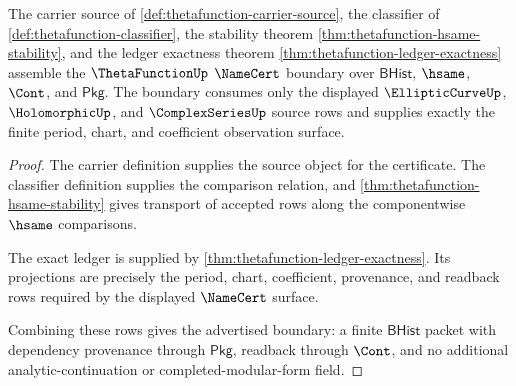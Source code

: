 \begin{theorem}
\label{thm:thetafunction-namecert-boundary}
The carrier source of \autoref{def:thetafunction-carrier-source}, the
classifier of \autoref{def:thetafunction-classifier}, the stability theorem
\autoref{thm:thetafunction-hsame-stability}, and the ledger exactness theorem
\autoref{thm:thetafunction-ledger-exactness} assemble the $\ThetaFunctionUp$
$\NameCert$ boundary over $\mathsf{BHist}$, $\hsame$, $\Cont$, and
$\mathsf{Pkg}$. The boundary consumes only the displayed $\EllipticCurveUp$,
$\HolomorphicUp$, and $\ComplexSeriesUp$ source rows and supplies exactly the
finite period, chart, and coefficient observation surface.
\end{theorem}
\begin{proof}
The carrier definition supplies the source object for the certificate. The
classifier definition supplies the comparison relation, and
\autoref{thm:thetafunction-hsame-stability} gives transport of accepted rows
along the componentwise $\hsame$ comparisons.

The exact ledger is supplied by
\autoref{thm:thetafunction-ledger-exactness}. Its projections are precisely the
period, chart, coefficient, provenance, and readback rows required by the
displayed $\NameCert$ surface.

Combining these rows gives the advertised boundary: a finite $\mathsf{BHist}$
packet with dependency provenance through $\mathsf{Pkg}$, readback through
$\Cont$, and no additional analytic-continuation or completed-modular-form
field.
\end{proof}

